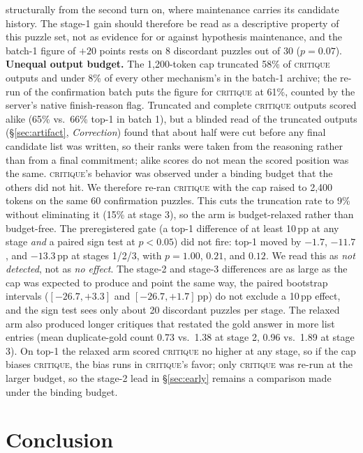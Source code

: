 \documentclass[10pt]{article}
\newcommand{\Mcrit}{\textsc{critique}}
\begin{document}
structurally from the second turn on, where maintenance carries its
candidate history. The stage-1 gain should therefore be read as a
descriptive property of this puzzle set, not as evidence for or against
hypothesis maintenance, and the batch-1 figure of $+20$ points rests on
8 discordant puzzles out of 30 ($p = 0.07$). \textbf{Unequal output budget.} The
1{,}200-token cap truncated 58\% of \Mcrit{} outputs and under 8\% of
every other mechanism's in the batch-1 archive; the re-run of the
confirmation batch puts the figure for \Mcrit{} at 61\%, counted by the
server's native finish-reason flag. Truncated and complete \Mcrit{}
outputs scored alike (65\% vs.\ 66\% top-1 in batch 1), but a blinded
read of the truncated outputs (\S\ref{sec:artifact},
\emph{Correction}) found that about half were cut before any final
candidate list was written, so their ranks were taken from the
reasoning rather than from a final commitment; alike scores do not
mean the scored position was the same. \Mcrit{}'s behavior was
observed under a binding budget that the
others did not hit. We therefore re-ran \Mcrit{} with the cap raised to
2{,}400 tokens on the same 60 confirmation puzzles. This cuts the
truncation rate to 9\% without eliminating it (15\% at stage 3), so the
arm is budget-relaxed rather than budget-free. The preregistered gate
(a top-1 difference of at least 10\,pp at any stage \emph{and} a paired
sign test at $p < 0.05$) did not fire: top-1 moved by $-1.7$, $-11.7$,
and $-13.3$\,pp at stages 1/2/3, with $p = 1.00$, $0.21$, and $0.12$.
We read this as \emph{not detected}, not as \emph{no effect}. The
stage-2 and stage-3 differences are as large as the cap was expected to
produce and point the same way, the paired bootstrap intervals
($[-26.7, +3.3]$ and $[-26.7, +1.7]$\,pp) do not exclude a 10\,pp
effect, and the sign test sees only about 20 discordant puzzles per
stage. The relaxed arm also produced longer critiques that restated the
gold answer in more list entries (mean duplicate-gold count 0.73 vs.\
1.38 at stage 2, 0.96 vs.\ 1.89 at stage 3). On top-1 the relaxed arm
scored \Mcrit{} no higher at any stage, so if the cap biases \Mcrit{},
the bias runs in \Mcrit{}'s favor; only \Mcrit{} was re-run at the larger
budget, so the stage-2 lead in \S\ref{sec:early} remains a comparison
made under the binding budget.

\section{Conclusion}
\label{sec:conclusion}
\end{document}
